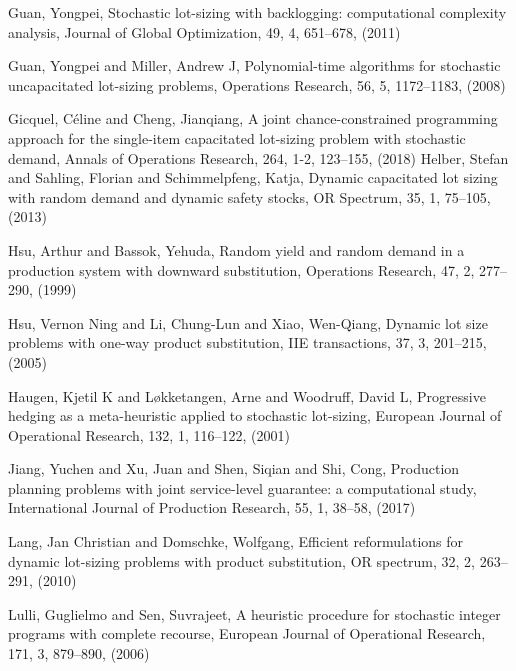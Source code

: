 \documentclass[10pt]{article}
\begin{document}
\begin{thebibliography}{99}

 Guan, Yongpei, Stochastic lot-sizing with backlogging: computational complexity analysis,  Journal of Global Optimization, 49, 4, 651--678, (2011)

  Guan, Yongpei and Miller, Andrew J, Polynomial-time algorithms for stochastic uncapacitated lot-sizing problems,  Operations Research, 56, 5, 1172--1183,
(2008)


Gicquel, C{\'e}line and Cheng, Jianqiang, A joint chance-constrained programming approach for the single-item capacitated lot-sizing problem with stochastic demand, Annals of Operations Research, 264, 1-2, 123--155, (2018)
 Helber, Stefan and Sahling, Florian and Schimmelpfeng, Katja, Dynamic capacitated lot sizing with random demand and dynamic safety stocks, OR Spectrum, 35, 1, 75--105, (2013)
 

Hsu, Arthur and Bassok, Yehuda, Random yield and random demand in a production system with downward substitution, Operations Research, 47, 2, 277--290,
  (1999)
  
Hsu, Vernon Ning and Li, Chung-Lun and Xiao, Wen-Qiang, Dynamic lot size problems with one-way product substitution, IIE transactions, 37, 3, 201--215, (2005)

Haugen, Kjetil K and L{\o}kketangen, Arne and Woodruff, David L, Progressive hedging as a meta-heuristic applied to stochastic lot-sizing, European Journal of Operational Research, 132, 1, 116--122, (2001)


 
 Jiang, Yuchen and Xu, Juan and Shen, Siqian and Shi, Cong, Production planning problems with joint service-level guarantee: a computational study, International Journal of Production Research, 55, 1, 38--58,
 (2017)
 
 Lang, Jan Christian and Domschke, Wolfgang, Efficient reformulations for dynamic lot-sizing problems with product substitution, OR spectrum,
32, 2, 263--291, (2010)

 Lulli, Guglielmo and Sen, Suvrajeet, A heuristic procedure for stochastic integer programs with complete recourse, European Journal of Operational Research,
171, 3, 879--890, (2006)


\end{thebibliography}
\end{document}
